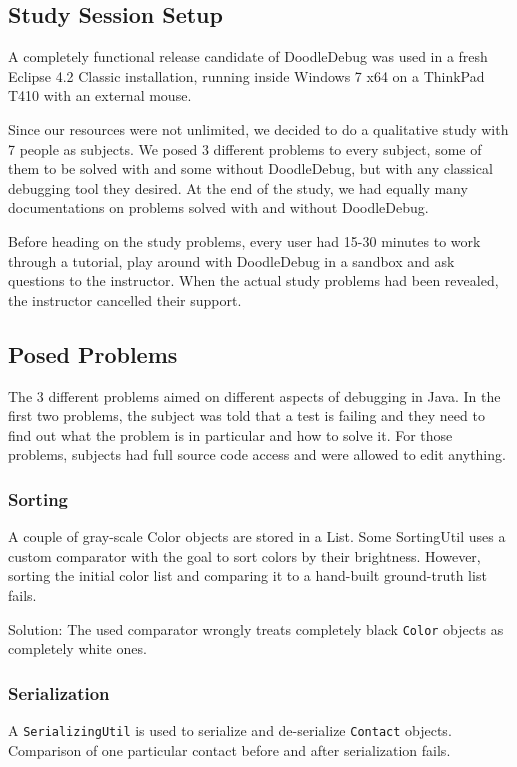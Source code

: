 \documentclass[english]{scrartcl}
\newcommand{\DD}{Dood\-le\-De\-bug\xspace}
\begin{document}
\subsection{Study Session Setup}
A completely functional release candidate of \DD was used in a fresh Eclipse 4.2 Classic installation, running inside Windows 7 x64 on a ThinkPad T410 with an external mouse.

Since our resources were not unlimited, we decided to do a qualitative study with 7 people as subjects.
We posed 3 different problems to every subject, some of them to be solved with and some without \DD, but with any classical debugging tool they desired.
At the end of the study, we had equally many documentations on problems solved with and without \DD.

Before heading on the study problems, every user had 15-30 minutes to work through a tutorial, play around with \DD in a sandbox and ask questions to the instructor.
When the actual study problems had been revealed, the instructor cancelled their support.

\subsection{Posed Problems}
The 3 different problems aimed on different aspects of debugging in Java.
In the first two problems, the subject was told that a test is failing and they need to find out what the problem is in particular and how to solve it.
For those problems, subjects had full source code access and were allowed to edit anything.

\subsubsection{Sorting}
A couple of gray-scale Color objects are stored in a List.
Some SortingUtil uses a custom comparator with the goal to sort colors by their brightness.
However, sorting the initial color list and comparing it to a hand-built ground-truth list fails.

Solution: The used comparator wrongly treats completely black \texttt{Color} objects as completely white ones.

\subsubsection{Serialization}
A \texttt{SerializingUtil} is used to serialize and de-serialize \texttt{Contact} objects.
Comparison of one particular contact before and after serialization fails.
\end{document}
